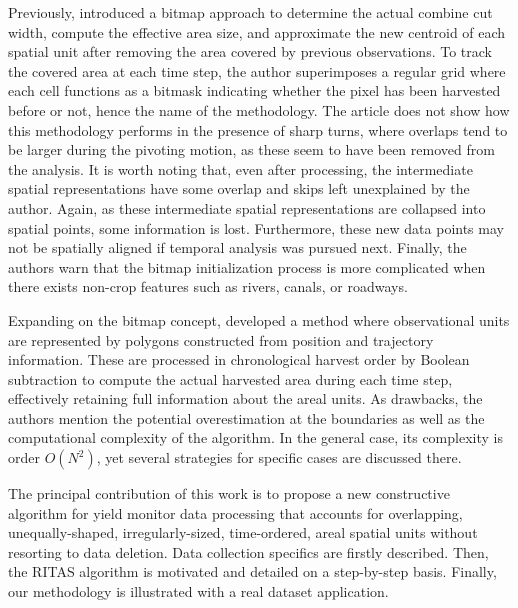 Previously, \cite{Han1997} introduced a bitmap approach to determine
the actual combine cut width, compute the effective area size, and
approximate the new centroid of each spatial unit after removing the
area covered by previous observations. To track the covered area at
each time step, the author superimposes a regular grid where each cell
functions as a bitmask indicating whether the pixel has been harvested
before or not, hence the name of the methodology. The article does not
show how this methodology performs in the presence of sharp turns,
where overlaps tend to be larger during the pivoting motion, as these
seem to have been removed from the analysis. It is worth noting that,
even after processing, the intermediate spatial representations have
some overlap and skips left unexplained by the author. Again, as these
intermediate spatial representations are collapsed into spatial
points, some information is lost. Furthermore, these new data points
may not be spatially aligned if temporal analysis was pursued
next. Finally, the authors warn that the bitmap initialization process
is more complicated when there exists non-crop features such as
rivers, canals, or roadways.

Expanding on the bitmap concept, \cite{Drummond1999} developed a
method where observational units are represented by polygons
constructed from position and trajectory information. These are
processed in chronological harvest order by Boolean subtraction to
compute the actual harvested area during each time step, effectively
retaining full information about the areal units. As drawbacks, the
authors mention the potential overestimation at the boundaries as well
as the computational complexity of the algorithm. In the general case,
its complexity is order $O(N^2)$, yet several strategies for specific
cases are discussed there.

The principal contribution of this work is to propose a new
constructive algorithm for yield monitor data processing that accounts
for overlapping, unequally-shaped, irregularly-sized, time-ordered,
areal spatial units without resorting to data deletion. Data
collection specifics are firstly described. Then, the RITAS algorithm
is motivated and detailed on a step-by-step basis. Finally, our
methodology is illustrated with a real dataset application.

